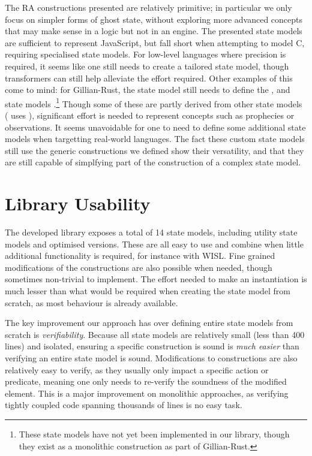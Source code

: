 The RA constructions presented are relatively primitive; in particular we only focus on simpler forms of ghost state, without exploring more advanced concepts that may make sense in a logic but not in an engine. The presented state models are sufficient to represent JavaScript, but fall short when attempting to model C, requiring specialised state models. For low-level languages where precision is required, it seems like one still needs to create a tailored state model, though transformers can still help alleviate the effort required. Other examples of this come to mind: for Gillian-Rust, the state model still needs to define the ,  and  state models \cite{gillianrust,sacha-phd}.\footnote{These state models have not yet been implemented in our library, though they exist as a monolithic construction as part of Gillian-Rust.} Though some of these are partly derived from other state models ( uses \PMap), significant effort is needed to represent concepts such as prophecies or observations. It seems unavoidable for one to need to define some additional state models when targetting real-world languages. The fact these custom state models still use the generic constructions we defined show their versatility, and that they are still capable of simplfying part of the construction of a complex state model.

\section{Library Usability} \label{sec:usability-library}

The developed library exposes a total of 14 state models, including utility state models and optimised versions. These are all easy to use and combine when little additional functionality is required, for instance with WISL. Fine grained modifications of the constructions are also possible when needed, though sometimes non-trivial to implement. The effort needed to make an instantiation is much lesser than what would be required when creating the state model from scratch, as most behaviour is already available.

The key improvement our approach has over defining entire state models from scratch is \emph{verifiability}. Because all state models are relatively small (less than 400 lines) and isolated, ensuring a specific construction is sound is \emph{much easier} than verifying an entire state model is sound. Modifications to constructions are also relatively easy to verify, as they usually only impact a specific action or predicate, meaning one only needs to re-verify the soundness of the modified element. This is a major improvement on monolithic approaches, as verifying tightly coupled code spanning thousands of lines is no easy task.

